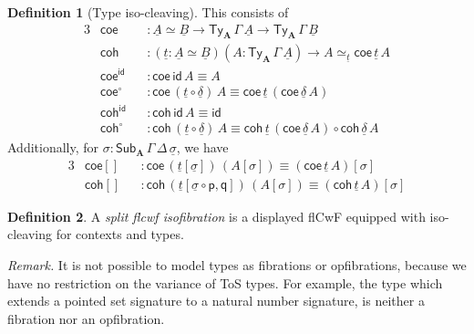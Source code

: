 \documentclass[12pt,a4paper,twoside,openany]{book}
\theoremstyle{remark}
\theoremstyle{definition}
\newtheorem{mydefinition}{Definition}
\theoremstyle{theorem}
\newcommand{\bs}[1]{\boldsymbol{#1}}
\newcommand{\id}{\mathsf{id}}
\newcommand{\Sub}{\mathsf{Sub}}
\newcommand{\Ty}{\mathsf{Ty}}
\newcommand{\ra}{\rightarrow}
\newcommand{\p}{\mathsf{p}}
\newcommand{\q}{\mathsf{q}}
\newcommand{\bA}{\bs{A}}
\newcommand{\ul}[1]{\underline{#1}}
\newcommand{\uldelta}{\ul{\delta}}
\newcommand{\ulsigma}{\ul{\sigma}}
\newcommand{\ult}{\ul{t}}
\newcommand{\ulA}{\ul{A}}
\newcommand{\ulB}{\ul{B}}
\newcommand{\coe}{\mathsf{coe}}
\newcommand{\coh}{\mathsf{coh}}
\begin{document}
\begin{mydefinition}[Type iso-cleaving] This consists of
\begin{alignat*}{3}
  & \coe &&: \ulA \simeq \ulB \ra \Ty_{\bA}\,\Gamma\,\ulA \ra \Ty_{\bA}\,\Gamma\,\ulB\\
  & \coh &&: (\ult : \ulA \simeq \ulB)(A : \Ty_{\bA}\,\Gamma\,\ulA)
           \ra A \simeq_{\ult} \coe\,\ult\,A\\
  & \coe^{\id} && : \coe\,\id\,A \equiv A\\
  & \coe^{\circ} && : \coe\,(\ult\circ\uldelta)\,A \equiv \coe\,\ult\,(\coe\,\uldelta\,A)\\
  & \coh^{\id} &&: \coh\,\id\,A \equiv \id\\
  & \coh^{\circ} &&: \coh\,(\ult\circ\uldelta)\,A \equiv \coh\,\ult\,(\coe\,\uldelta\,A)
          \circ \coh\,\uldelta\,A
\end{alignat*}
Additionally, for $\sigma : \Sub_{\bA}\,\Gamma\,\Delta\,\ulsigma$, we have
\begin{alignat*}{3}
  & \coe[] &&: \coe\,(\ult[\ulsigma])\,(A[\sigma]) \equiv (\coe\,\ult\,A)[\sigma]\\
  & \coh[] &&: \coh\,(\ult[\ulsigma\circ \p,\q])\,(A[\sigma]) \equiv (\coh\,\ult\,A)[\sigma]
\end{alignat*}

\end{mydefinition}

\begin{mydefinition} A \emph{split flcwf isofibration} is a displayed flCwF equipped with iso-cleaving for contexts and types.
\end{mydefinition}

\emph{Remark.} It is not possible to model types as fibrations or opfibrations,
because we have no restriction on the variance of ToS types. For example, the
type which extends a pointed set signature to a natural number signature, is
neither a fibration nor an opfibration.
\end{document}
